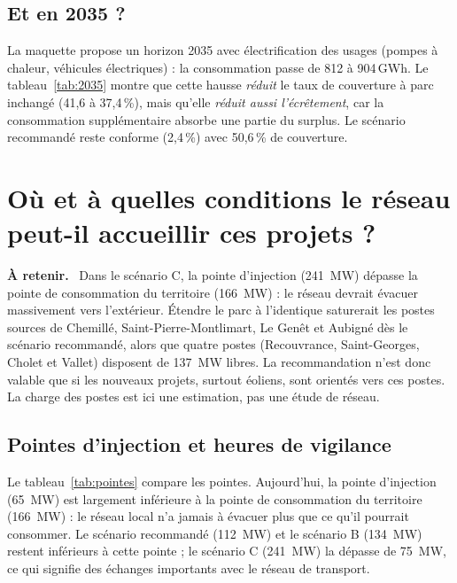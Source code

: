 \documentclass[11pt, a4paper]{report}
\newenvironment{retenir}{\par\medskip\noindent\textbf{À retenir.}\ }{\par\medskip}
\newcommand{\pct}{\,\%}
\newcommand{\gwh}{\,GWh}
\begin{document}
\section{Et en 2035 ?}

La maquette propose un horizon 2035 avec électrification des usages (pompes à chaleur, véhicules électriques) : la consommation passe de 812 à 904\gwh. Le tableau~\ref{tab:2035} montre que cette hausse \emph{réduit} le taux de couverture à parc inchangé (41,6 à 37,4\pct{}), mais qu'elle \emph{réduit aussi l'écrêtement}, car la consommation supplémentaire absorbe une partie du surplus. Le scénario recommandé reste conforme (2,4\pct) avec 50,6\pct{} de couverture.


\chapter{Où et à quelles conditions le réseau peut-il accueillir ces projets ?}
\label{chap:reseau}

\begin{retenir}
Dans le scénario C, la pointe d'injection (241~MW) dépasse la pointe de consommation du territoire (166~MW) : le réseau devrait évacuer massivement vers l'extérieur. Étendre le parc à l'identique saturerait les postes sources de Chemillé, Saint-Pierre-Montlimart, Le Genêt et Aubigné dès le scénario recommandé, alors que quatre postes (Recouvrance, Saint-Georges, Cholet et Vallet) disposent de 137~MW libres. La recommandation n'est donc valable que si les nouveaux projets, surtout éoliens, sont orientés vers ces postes. La charge des postes est ici une estimation, pas une étude de réseau.
\end{retenir}

\section{Pointes d'injection et heures de vigilance}

Le tableau~\ref{tab:pointes} compare les pointes. Aujourd'hui, la pointe d'injection (65~MW) est largement inférieure à la pointe de consommation du territoire (166~MW) : le réseau local n'a jamais à évacuer plus que ce qu'il pourrait consommer. Le scénario recommandé (112~MW) et le scénario B (134~MW) restent inférieurs à cette pointe ; le scénario C (241~MW) la dépasse de 75~MW, ce qui signifie des échanges importants avec le réseau de transport.
\end{document}
